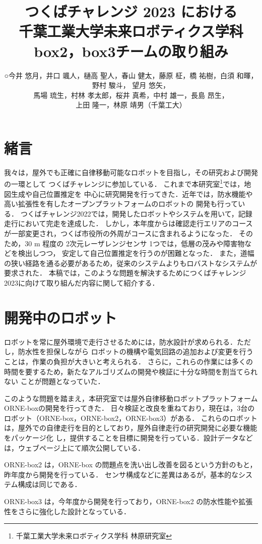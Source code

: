 \documentclass[twocolumn, 9pt]{jsproceedings}
\title{つくばチャレンジ 2023 における\\千葉工業大学未来ロボティクス学科 box2，box3チームの取り組み}
\author{○今井 悠月，井口 颯人，樋高 聖人，春山 健太，藤原 柾，\CID{8705}橋 祐樹，白須 和暉，野村 駿斗，
望月 悠矢，\\馬場 琉生，村林 孝太郎，桜井 真希，中村 雄一，長島 昂生，\\上田 隆一，林原 靖男（千葉工大）}
\affiliation{千葉工業大学未来ロボティクス学科 box2, box3チーム}
\begin{document}
\maketitle

\section{緒言}
我々は，屋外でも正確に自律移動可能なロボットを目指し，その研究および開発の一環として
つくばチャレンジに参加している．
これまで本研究室\footnote{千葉工業大学未来ロボティクス学科 林原研究室}では，地図生成や自己位置推定を
中心に研究開発を行ってきた．近年では，防水機能や高い拡張性を有したオープンプラットフォームのロボットの
開発も行っている．
つくばチャレンジ2022では，開発したロボットやシステムを用いて，記録走行において完走を達成した．
しかし，本年度からは確認走行エリアのコースが一部変更され，つくば市役所の外周がコースに含まれるようになった．
そのため，30 m 程度の 2次元レーザレンジセンサ 1つでは，低層の茂みや障害物などを検出しつつ，
安定して自己位置推定を行うのが困難となった．
また，道幅の狭い経路を通る必要があるため，従来のシステムよりもロバストなシステムが要求された．
本稿では，このような問題を解決するためにつくばチャレンジ2023に向けて取り組んだ内容に関して紹介する．

\section{開発中のロボット}
ロボットを常に屋外環境で走行させるためには，防水設計が求められる．ただし，防水性を担保しながら
ロボットの機構や電気回路の追加および変更を行うことは，作業の負担が大きいと考えられる．
さらに，これらの作業には多くの時間を要するため，新たなアルゴリズムの開発や検証に十分な時間を割当てられない
ことが問題となっていた．

このような問題を踏まえ，本研究室では屋外自律移動ロボットプラットフォーム ORNE-boxの開発を行ってきた\cite{box}．
日々検証と改良を重ねており，現在は，3台のロボット（ORNE-box，ORNE-box2，ORNE-box3）がある．
これらのロボットは，屋外での自律走行を目的としており，屋外自律走行の研究開発に必要な機能をパッケージ化
し，提供することを目標に開発を行っている．設計データなどは，ウェブページ上にて順次公開している\cite{box-data}．

ORNE-box2 は，ORNE-box の問題点を洗い出し改善を図るという方針のもと，昨年度から開発を行っている．
センサ構成などに差異はあるが，基本的なシステム構成は同じである．

ORNE-box3 は，今年度から開発を行っており，ORNE-box2 の防水性能や拡張性をさらに強化した設計となっている．
\end{document}
